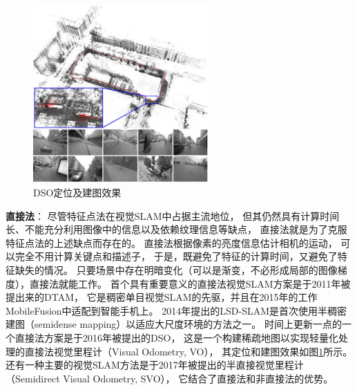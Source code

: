 \begin{figure}[htbp]
    \centering
    \includegraphics[width = 0.6\textwidth]{figures/dso_demo.png}
    \caption{DSO定位及建图效果\cite{engel2017direct}}
    \label{fig:dso_demo}
\end{figure}

\textbf{直接法}：
尽管特征点法在视觉SLAM中占据主流地位，
但其仍然具有计算时间长、不能充分利用图像中的信息以及依赖纹理信息等缺点，
直接法就是为了克服特征点法的上述缺点而存在的。
直接法根据像素的亮度信息估计相机的运动，
可以完全不用计算关键点和描述子，
于是，既避免了特征的计算时间，又避免了特征缺失的情况。
只要场景中存在明暗变化（可以是渐变，不必形成局部的图像梯度），直接法就能工作。
首个具有重要意义的直接法视觉SLAM方案是于2011年被提出来的DTAM\cite{newcombe2011dtam}，
它是稠密单目视觉SLAM的先驱，并且在2015年的工作MobileFusion\cite{ondruvska2015mobilefusion}中适配到智能手机上。
2014年提出的LSD-SLAM\cite{engel2014lsd}是首次使用半稠密建图（semidense mapping）以适应大尺度环境的方法之一。
时间上更新一点的一个直接法方案是于2016年被提出的DSO\cite{engel2017direct}，
这是一个构建稀疏地图以实现轻量化处理的直接法视觉里程计（Visual Odometry, VO），
其定位和建图效果如图\ref{fig:dso_demo}所示。
还有一种主要的视觉SLAM方法是于2017年被提出的半直接视觉里程计（Semidirect Visual Odometry, SVO）\cite{forster2016svo}，
它结合了直接法和非直接法的优势。

